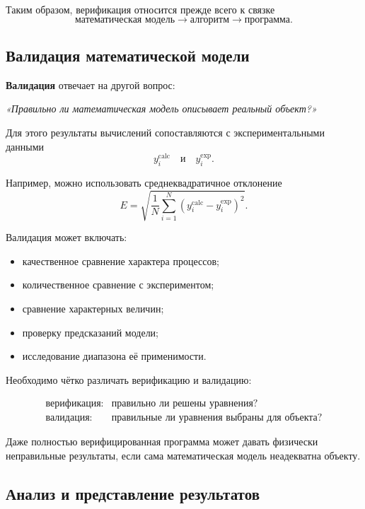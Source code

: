 Таким образом, верификация относится прежде всего к связке
\[
\text{математическая модель}
\longrightarrow
\text{алгоритм}
\longrightarrow
\text{программа}.
\]


\subsection{Валидация математической модели}

\textbf{Валидация} отвечает на другой вопрос:

\begin{center}
	\textit{«Правильно ли математическая модель описывает реальный объект?»}
\end{center}

Для этого результаты вычислений сопоставляются с экспериментальными данными
\[
y_i^{\text{calc}}
\quad\text{и}\quad
y_i^{\text{exp}}.
\]

Например, можно использовать среднеквадратичное отклонение
\[
E =
\sqrt{
	\frac{1}{N}
	\sum_{i=1}^{N}
	\left(
	y_i^{\text{calc}}-
	y_i^{\text{exp}}
	\right)^2
}.
\]

Валидация может включать:
\begin{itemize}
	\item качественное сравнение характера процессов;
	\item количественное сравнение с экспериментом;
	\item сравнение характерных величин;
	\item проверку предсказаний модели;
	\item исследование диапазона её применимости.
\end{itemize}

Необходимо чётко различать верификацию и валидацию:

\[
\boxed{
	\begin{array}{ll}
		\text{верификация:} & \text{правильно ли решены уравнения?}\\[2mm]
		\text{валидация:} & \text{правильные ли уравнения выбраны для объекта?}
\end{array}}
\]

Даже полностью верифицированная программа может давать физически неправильные результаты, если сама математическая модель неадекватна объекту.


\subsection{Анализ и представление результатов}

